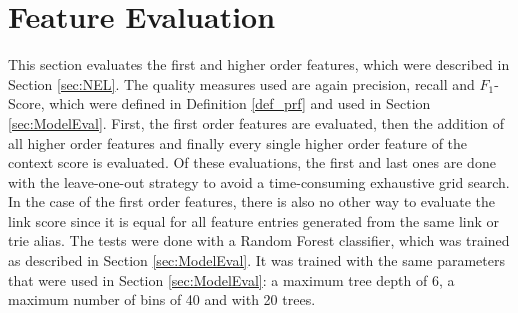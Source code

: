 \section{Feature Evaluation}
\label{sec:FeatureEval}
This section evaluates the first and higher order features, which were described in Section \ref{sec:NEL}. The quality measures used are again precision, recall and $F_1$-Score, which were defined in Definition \ref{def_prf} and used in Section \ref{sec:ModelEval}. First, the first order features are evaluated, then the addition of all higher order features and finally every single higher order feature of the context score is evaluated. Of these evaluations, the first and last ones are done with the leave-one-out strategy to avoid a time-consuming exhaustive grid search. In the case of the first order features, there is also no other way to evaluate the link score since it is equal for all feature entries generated from the same link or trie alias. The tests were done with a Random Forest classifier, which was trained as described in Section \ref{sec:ModelEval}. It was trained with the same parameters that were used in Section \ref{sec:ModelEval}: a maximum tree depth of 6, a maximum number of bins of 40 and with 20 trees.\par

